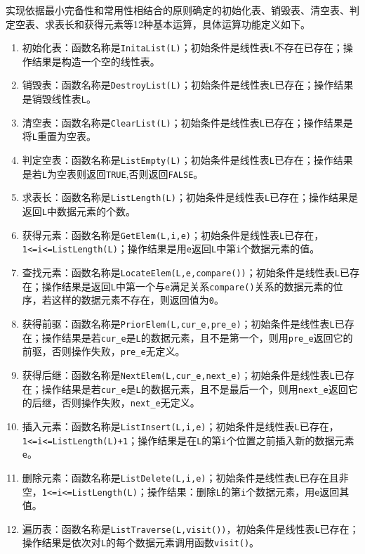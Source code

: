 \documentclass[supercite]{Experimental_Report}
\theoremstyle{definition}
\begin{document}
实现依据最小完备性和常用性相结合的原则确定的初始化表、销毁表、清空表、判定空表、求表长和获得元素等12种基本运算，具体运算功能定义如下。
\begin{enumerate}


	\item 初始化表：函数名称是\verb|InitaList(L)|；初始条件是线性表\verb|L|不存在已存在；操作结果是构造一个空的线性表。


	\item 销毁表：函数名称是\verb|DestroyList(L)|；初始条件是线性表\verb|L|已存在；操作结果是销毁线性表\verb|L|。


	\item 清空表：函数名称是\verb|ClearList(L)|；初始条件是线性表\verb|L|已存在；操作结果是将\verb|L|重置为空表。


	\item 判定空表：函数名称是\verb|ListEmpty(L)|；初始条件是线性表\verb|L|已存在；操作结果是若\verb|L|为空表则返回\verb|TRUE|,否则返回\verb|FALSE|。


	\item 求表长：函数名称是\verb|ListLength(L)|；初始条件是线性表\verb|L|已存在；操作结果是返回\verb|L|中数据元素的个数。


	\item 获得元素：函数名称是\verb|GetElem(L,i,e)|；初始条件是线性表\verb|L|已存在， \\ \verb|1<=i<=ListLength(L)|；操作结果是用\verb|e|返回\verb|L|中第\verb|i|个数据元素的值。


	\item 查找元素：函数名称是\verb|LocateElem(L,e,compare())|；初始条件是线性表\verb|L|已存在；操作结果是返回\verb|L|中第一个与\verb|e|满足关系\verb|compare()|关系的数据元素的位序，若这样的数据元素不存在，则返回值为\verb|0|。


	\item 获得前驱：函数名称是\verb|PriorElem(L,cur_e,pre_e)|；初始条件是线性表\verb|L|已存在；操作结果是若\verb|cur_e|是\verb|L|的数据元素，且不是第一个，则用\verb|pre_e|返回它的前驱，否则操作失败，\verb|pre_e|无定义。


	\item 获得后继：函数名称是\verb|NextElem(L,cur_e,next_e)|；初始条件是线性表\verb|L|已存在；操作结果是若\verb|cur_e|是\verb|L|的数据元素，且不是最后一个，则用\verb|next_e|返回它的后继，否则操作失败，\verb|next_e|无定义。


	\item 插入元素：函数名称是\verb|ListInsert(L,i,e)|；初始条件是线性表\verb|L|已存在，\\ \verb|1<=i<=ListLength(L)+1|；操作结果是在\verb|L|的第\verb|i|个位置之前插入新的数据元素\verb|e|。


	\item 删除元素：函数名称是\verb|ListDelete(L,i,e)|；初始条件是线性表\verb|L|已存在且非空，\verb|1<=i<=ListLength(L)|；操作结果：删除\verb|L|的第\verb|i|个数据元素，用\verb|e|返回其值。


	\item 遍历表：函数名称是\verb|ListTraverse(L,visit())|，初始条件是线性表\verb|L|已存在；操作结果是依次对\verb|L|的每个数据元素调用函数\verb|visit()|。
\end{enumerate}
\end{document}
